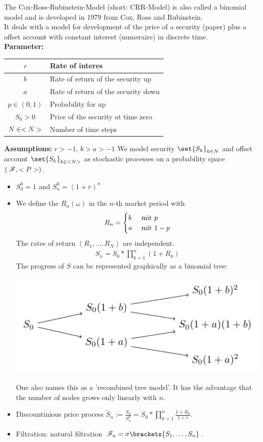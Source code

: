 The Cox-Ross-Rubinstein-Model (short: CRR-Model) is also called a binomial model and is developed in 1979 from Cox, Ross and Rubinstein.\\
It deals with a model for development of the price of a security (paper) plus a offset account with constant interest (numeraire) in discrete time.\\
\textbf{Parameter:}

\begin{center}
	\begin{tabular}{|c|l|}
		\hline
		$r$ & Rate of interes \\ \hline
		$b$ & Rate of return of the security up \\ \hline
		$a$ & Rate of return of the security down \\ \hline
		$p \in (0,1)$ &Probability for up \\ \hline
		$S_0 > 0$ & Price of the security at time zero \\ \hline
		$N \in \N$ & Number of time steps \\ \hline
	\end{tabular}
\end{center}
\textbf{Assumptions:} $r > -1$, $b > a > -1$
We model security $\set{S_k}_{k \in N}$ and offset account $\set{S_k}_{k \in \N}$ as stochastic processes on a probability space $(\, \F, \P)$.
\begin{itemize}
	\item $S_0^0 = 1$ and $S_n^0 = (1+r)^n$
	\item We define the  $R_n(\omega)$ in the $n$-th market period with
	\begin{align*}
		R_n = \begin{cases} b & \mit p \\ a & \mit 1-p \end{cases}
	\end{align*}
	The rates of return $(R_1, \dots, R_N)$ are independent.
	\begin{align*}
		S_n = S_0 * \prod_{k=1}^n (1+R_k)
	\end{align*}
	The progress of $S$ can be represented graphically as a binomial tree: 
	\begin{center}
		\includegraphics[width=.5\textwidth]{tikz/stochv_1_2_crr.pdf}
	\end{center}
	One also names this as a 'recombined tree model'. It has the advantage that the number of nodes grows only linearly with $n$. 
	\item Discountinious price process $\tilde{S}_n := \frac{S_n}{S_n^0} = S_0 * \prod_{k=1}^n \frac{1+R_k}{1+r}$.
	\item Filtration: natural filtration $\F_n = \sigma \brackets{S_1, \dots, S_n}$.
\end{itemize}

